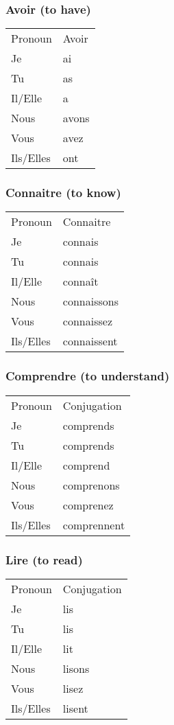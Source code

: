 \subsubsection{Avoir (to have)}
\begin{tabular}{| l | l |}
\hline
Pronoun 	& 	Avoir	\\
Je		&	ai	\\
Tu		&	as	\\
Il/Elle		&	a	\\
Nous		&	avons	\\
Vous		&	avez	\\
Ils/Elles	&	ont	\\
\hline
\end{tabular}

\subsubsection{Connaitre (to know)}
\begin{tabular}{| l | l |}
\hline
Pronoun 	& 	Connaitre	\\
Je		    &	connais		\\
Tu		    &	connais		\\
Il/Elle     &	conna\^it	\\
Nous		&	connaissons	\\
Vous		&	connaissez	\\
Ils/Elles	&	connaissent	\\
\hline
\end{tabular}

\subsubsection{Comprendre (to understand)}
\begin{tabular}{| l | l |}
\hline
Pronoun 	& 	Conjugation	\\
Je		&	comprends	\\
Tu		&	comprends	\\
Il/Elle		&	comprend	\\
Nous		&	comprenons	\\
Vous		&	comprenez	\\
Ils/Elles	&	comprennent	\\
\hline
\end{tabular}

\subsubsection{Lire (to read)}
\begin{tabular}{| l | l |}
\hline
Pronoun 	& 	Conjugation	\\
Je		&	lis		\\
Tu		&	lis		\\
Il/Elle		&	lit		\\
Nous		&	lisons		\\
Vous		&	lisez		\\
Ils/Elles	&	lisent		\\
\hline
\end{tabular}

